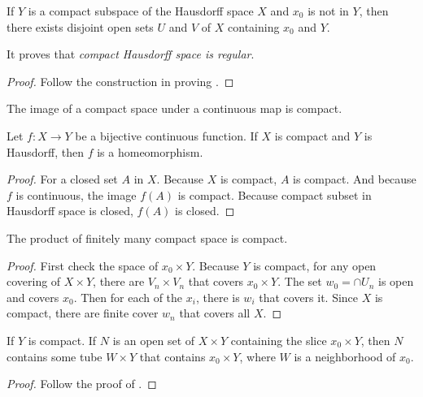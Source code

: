 \begin{theorem}\label{disjoint_openset_of_x_and_compact_set}
    If $Y$ is a compact subspace of the Hausdorff space $X$ and $x_0$ is not in $Y$, then there exists disjoint open sets $U$ and $V$ of $X$ containing $x_0$ and $Y$.    
    
    It proves that \emph{compact Hausdorff space is regular}.
\end{theorem}
\begin{proof}
    Follow the construction in proving .
\end{proof}

\begin{theorem}
    The image of a compact space under a continuous map is compact.    
\end{theorem}

\begin{theorem}
    Let $f: X \rightarrow Y$ be a bijective continuous function. If $X$ is compact and $Y$ is Hausdorff, then $f$ is a homeomorphism.
\end{theorem}
\begin{proof}
    For a closed set $A$ in $X$. Because $X$ is compact, $A$ is compact. And because $f$ is continuous, the image $f(A)$ is compact. Because compact subset in Hausdorff space is closed, $f(A)$ is closed.
\end{proof}

\begin{theorem}\label{finite_product_of_compact_space}
    The product of finitely many compact space is compact.
\end{theorem}
\begin{proof}
    First check the space of $x_0 \times Y$. Because $Y$ is compact, for any open covering of $X \times Y$, there are $V_n \times V_n$ that covers $x_0 \times Y$. The set $w_0 = \cap U_n$ is open and covers $x_0$. Then for each of the $x_i$, there is $w_i$ that covers it. Since $X$ is compact, there are finite cover $w_n$ that covers all $X$.
\end{proof}

\begin{theorem}
    If $Y$ is compact. If $N$ is an open set of $X \times Y$ containing the slice $x_0 \times Y$, then $N$ contains some tube $W \times Y$ that contains $x_0 \times Y$, where $W$ is a neighborhood of $x_0$.
\end{theorem}
\begin{proof}
    Follow the proof of .
\end{proof}

